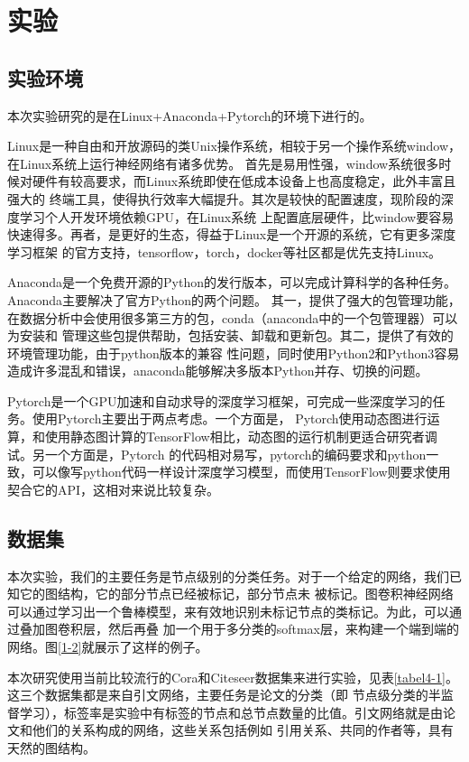 \cleardoublepage

\section{实验}
\subsection{实验环境}
本次实验研究的是在Linux+Anaconda+Pytorch的环境下进行的。

Linux是一种自由和开放源码的类Unix操作系统，相较于另一个操作系统window，在Linux系统上运行神经网络有诸多优势。
首先是易用性强，window系统很多时候对硬件有较高要求，而Linux系统即使在低成本设备上也高度稳定，此外丰富且强大的
终端工具，使得执行效率大幅提升。其次是较快的配置速度，现阶段的深度学习个人开发环境依赖GPU，在Linux系统
上配置底层硬件，比window要容易快速得多。再者，是更好的生态，得益于Linux是一个开源的系统，它有更多深度学习框架
的官方支持，tensorflow，torch，docker等社区都是优先支持Linux。

Anaconda是一个免费开源的Python的发行版本，可以完成计算科学的各种任务。Anaconda主要解决了官方Python的两个问题。
其一，提供了强大的包管理功能，在数据分析中会使用很多第三方的包，conda（anaconda中的一个包管理器）可以为安装和
管理这些包提供帮助，包括安装、卸载和更新包。其二，提供了有效的环境管理功能，由于python版本的兼容
性问题，同时使用Python2和Python3容易造成许多混乱和错误，anaconda能够解决多版本Python并存、切换的问题。

Pytorch是一个GPU加速和自动求导的深度学习框架，可完成一些深度学习的任务。使用Pytorch主要出于两点考虑。一个方面是，
Pytorch使用动态图进行运算，和使用静态图计算的TensorFlow相比，动态图的运行机制更适合研究者调试。另一个方面是，Pytorch
的代码相对易写，pytorch的编码要求和python一致，可以像写python代码一样设计深度学习模型，而使用TensorFlow则要求使用
契合它的API，这相对来说比较复杂。

\subsection{数据集}
本次实验，我们的主要任务是节点级别的分类任务。对于一个给定的网络，我们已知它的图结构，它的部分节点已经被标记，部分节点未
被标记。图卷积神经网络可以通过学习出一个鲁棒模型，来有效地识别未标记节点的类标记。为此，可以通过叠加图卷积层，然后再叠
加一个用于多分类的softmax层，来构建一个端到端的网络。图\ref{1-2}就展示了这样的例子。

本次研究使用当前比较流行的Cora和Citeseer数据集来进行实验，见表\ref{tabel4-1}。这三个数据集都是来自引文网络，主要任务是论文的分类（即
节点级分类的半监督学习），标签率是实验中有标签的节点和总节点数量的比值。引文网络就是由论文和他们的关系构成的网络，这些关系包括例如
引用关系、共同的作者等，具有天然的图结构。

